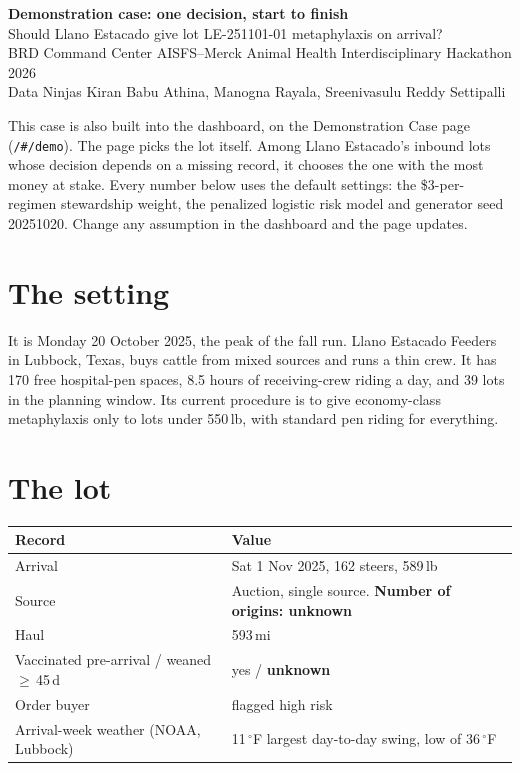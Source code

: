 \documentclass[10pt,letterpaper]{article}
\newcommand{\teamname}{Data Ninjas}
\newcommand{\teammembers}{Kiran Babu Athina, Manogna Rayala, Sreenivasulu Reddy Settipalli}
\newcommand{\usd}[1]{\$#1}
\begin{document}
\begin{center}
  {\LARGE\bfseries\color{accent} Demonstration case: one decision, start to finish}\\[4pt]
  {\large Should Llano Estacado give lot LE-251101-01 metaphylaxis on arrival?}\\[5pt]
  {\small BRD Command Center \textbullet{} AISFS--Merck Animal Health Interdisciplinary Hackathon 2026}\\[2pt]
  {\small \teamname{} \textbullet{} \teammembers}
\end{center}

This case is also built into the dashboard, on the Demonstration Case page (\texttt{/\#/demo}). The page picks the lot itself. Among Llano Estacado's inbound lots whose decision depends on a missing record, it chooses the one with the most money at stake. Every number below uses the default settings: the \usd{3}-per-regimen stewardship weight, the penalized logistic risk model and generator seed 20251020. Change any assumption in the dashboard and the page updates.

\section{The setting}

It is Monday 20 October 2025, the peak of the fall run. Llano Estacado Feeders in Lubbock, Texas, buys cattle from mixed sources and runs a thin crew. It has 170 free hospital-pen spaces, 8.5 hours of receiving-crew riding a day, and 39 lots in the planning window. Its current procedure is to give economy-class metaphylaxis only to lots under 550\,lb, with standard pen riding for everything.

\section{The lot}

\begin{table}[h]
\centering\small
{}
\begin{tabular}{@{}ll@{}}
\toprule
\textbf{Record} & \textbf{Value} \\
\midrule
Arrival & Sat 1 Nov 2025, 162 steers, 589\,lb \\
Source & Auction, single source. \textbf{Number of origins: unknown} \\
Haul & 593\,mi \\
Vaccinated pre-arrival / weaned $\geq$\,45\,d & yes / \textbf{unknown} \\
Order buyer & flagged high risk \\
Arrival-week weather (NOAA, Lubbock) & 11\,$^\circ$F largest day-to-day swing, low of 36\,$^\circ$F \\
\bottomrule
\end{tabular}
\end{table}
\end{document}
